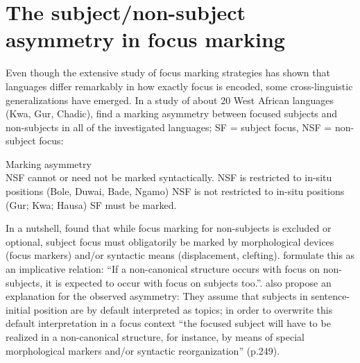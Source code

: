 \documentclass[output=paper,colorlinks,citecolor=brown]{langscibook}
\begin{document}
\section{The subject\slash non-subject asymmetry in focus marking}\label{sec:amaechi:4}

Even though the extensive study of focus marking strategies has shown that languages differ remarkably in how exactly focus is encoded, some cross-linguistic  generalizations have  emerged. In a study of about 20 West African languages (Kwa, Gur, Chadic), \citet{FiedlerEtAl2010} find a marking asymmetry between focused subjects and non-subjects in all of the investigated languages;
SF = subject focus, NSF = non-subject focus:

\ea%
    \label{ex:amaechi:14} 
    Marking asymmetry \citealt[242,~ex. (11)]{FiedlerEtAl2010}\\
    \ea\label{ex:amaechi:14a}
        NSF cannot or need not be marked syntactically.
        \ea\label{ex:amaechi:14ai}
            NSF is restricted to in-situ positions (Bole, Duwai, Bade, Ngamo)
        \ex\label{ex:amaechi:14aii} 
            NSF is not restricted to in-situ positions (Gur; Kwa; Hausa)
        \z
    \ex\label{ex:amaechi:14b}
        SF must be marked.
    \z
\z

In a nutshell, \citet{FiedlerEtAl2010} found that while focus marking for non-subjects is excluded or optional, subject focus must obligatorily be marked by morphological devices (focus markers) and/or syntactic means (displacement, clefting). \citet[171f]{SkopeteasFanselow2010} formulate this as an implicative relation: ``If a non-canonical structure occurs with focus on non-subjects, it is expected to occur with focus on subjects too.''. \citet{FiedlerEtAl2010} also propose an explanation for the observed asymmetry:  They assume that subjects in sentence-initial position are by default interpreted as topics; in order to overwrite this default interpretation in a focus context ``the focused subject will have to be realized in a non-canonical structure, for instance, by means of special morphological markers and/or syntactic reorganization'' (p.249).
\end{document}
